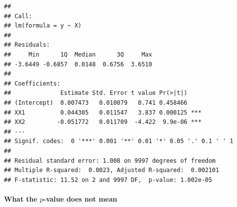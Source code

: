 \documentclass[]{book}
\newenvironment{Shaded}{\begin{snugshade}}{\end{snugshade}}
\newcommand{\KeywordTok}[1]{\textcolor[rgb]{0.13,0.29,0.53}{\textbf{#1}}}
\newcommand{\DataTypeTok}[1]{\textcolor[rgb]{0.13,0.29,0.53}{#1}}
\newcommand{\DecValTok}[1]{\textcolor[rgb]{0.00,0.00,0.81}{#1}}
\newcommand{\FloatTok}[1]{\textcolor[rgb]{0.00,0.00,0.81}{#1}}
\newcommand{\StringTok}[1]{\textcolor[rgb]{0.31,0.60,0.02}{#1}}
\newcommand{\OperatorTok}[1]{\textcolor[rgb]{0.81,0.36,0.00}{\textbf{#1}}}
\newcommand{\NormalTok}[1]{#1}
\let\oldparagraph\paragraph
\renewcommand{\paragraph}[1]{\oldparagraph{#1}\mbox{}}
\begin{document}
\begin{Shaded}
\end{Shaded}

\begin{verbatim}
## 
## Call:
## lm(formula = y ~ X)
## 
## Residuals:
##     Min      1Q  Median      3Q     Max 
## -3.6449 -0.6857  0.0148  0.6756  3.6510 
## 
## Coefficients:
##              Estimate Std. Error t value Pr(>|t|)    
## (Intercept)  0.007473   0.010079   0.741 0.458466    
## XX1          0.044305   0.011547   3.837 0.000125 ***
## XX2         -0.051772   0.011709  -4.422  9.9e-06 ***
## ---
## Signif. codes:  0 '***' 0.001 '**' 0.01 '*' 0.05 '.' 0.1 ' ' 1
## 
## Residual standard error: 1.008 on 9997 degrees of freedom
## Multiple R-squared:  0.0023, Adjusted R-squared:  0.002101 
## F-statistic: 11.52 on 2 and 9997 DF,  p-value: 1.002e-05
\end{verbatim}

\paragraph{\texorpdfstring{What the \(p\)-value does not
mean}{What the p-value does not mean}}\label{what-the-p-value-does-not-mean}
\end{document}
